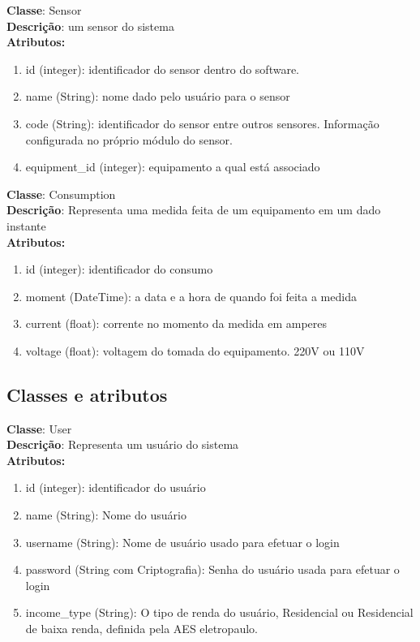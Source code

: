 \textbf{Classe}: Sensor\\
\textbf{Descrição}: um sensor do sistema\\	
\textbf{Atributos:}
\begin{enumerate}
	\item id (integer): identificador do sensor dentro do software.
	\item name (String): nome dado pelo usuário para o sensor
	\item code (String): identificador do sensor entre outros sensores. Informação configurada no próprio módulo do sensor.
	\item equipment\_id (integer): equipamento a qual está associado
\end{enumerate}

\textbf{Classe}: Consumption\\
\textbf{Descrição}: Representa uma medida feita de um equipamento em um dado instante\\	
\textbf{Atributos:}
\begin{enumerate}
	\item id (integer): identificador do consumo
	\item moment (DateTime): a data e a hora de quando foi feita a medida
	\item current (float): corrente no momento da medida em amperes
	\item voltage (float): voltagem do tomada do equipamento. 220V ou 110V
\end{enumerate}

\subsection{Classes e atributos}
	\textbf{Classe}: User\\
	\textbf{Descrição}: Representa um usuário do sistema\\	
	\textbf{Atributos:}
\begin{enumerate}
	\item id (integer): identificador do usuário
	\item name (String):  Nome do usuário
	\item username (String): Nome de usuário usado para efetuar o login
	\item password (String com Criptografia): Senha do usuário usada para efetuar o login
    \item income\_type (String): O tipo de renda do usuário, Residencial ou Residencial de baixa renda, definida pela AES eletropaulo.
\end{enumerate}

